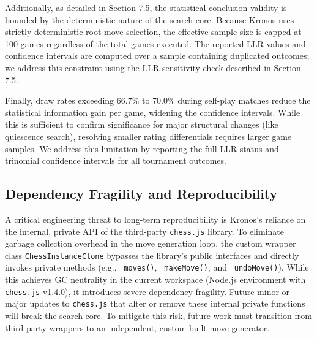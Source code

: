 Additionally, as detailed in Section 7.5, the statistical conclusion validity is bounded by the deterministic nature of the search core. Because Kronos uses strictly deterministic root move selection, the effective sample size is capped at 100 games regardless of the total games executed. The reported LLR values and confidence intervals are computed over a sample containing duplicated outcomes; we address this constraint using the LLR sensitivity check described in Section 7.5.

Finally, draw rates exceeding 66.7\% to 70.0\% during self-play matches reduce the statistical information gain per game, widening the confidence intervals. While this is sufficient to confirm significance for major structural changes (like quiescence search), resolving smaller rating differentials requires larger game samples. We address this limitation by reporting the full LLR status and trinomial confidence intervals for all tournament outcomes.

\subsection{Dependency Fragility and Reproducibility}
A critical engineering threat to long-term reproducibility is Kronos's reliance on the internal, private API of the third-party \texttt{chess.js} library. To eliminate garbage collection overhead in the move generation loop, the custom wrapper class \texttt{ChessInstanceClone} bypasses the library's public interfaces and directly invokes private methods (e.g., \texttt{\_moves()}, \texttt{\_makeMove()}, and \texttt{\_undoMove()}). While this achieves GC neutrality in the current workspace (Node.js environment with \texttt{chess.js} v1.4.0), it introduces severe dependency fragility. Future minor or major updates to \texttt{chess.js} that alter or remove these internal private functions will break the search core. To mitigate this risk, future work must transition from third-party wrappers to an independent, custom-built move generator.

